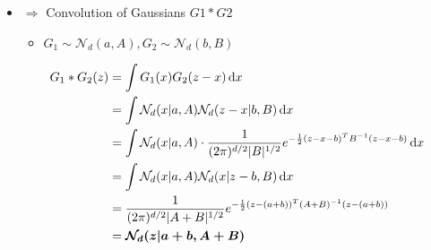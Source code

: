 \begin{itemize}
\begin{itemize}
	\item $\Rightarrow$ Convolution of Gaussians $G1* G2$
		\begin{itemize}
		\item $G_1\sim \mathcal N_d(a,A),G_2\sim \mathcal N_d(b,B)$
		\end{itemize}
		\begin{align*} \displaystyle G_1* G_2 (z) &= \int G_1(x)G_2(z-x)\mathop{}\!\mathrm{d} x \\ &= \int \mathcal N_d (x|a,A)\mathcal N_d(z-x|b,B)\mathop{}\!\mathrm{d} x \\ &= \int \mathcal N_d (x|a,A) \cdot \frac 1 {(2\pi)^{d/2} |B|^{1/2}} e^{-\frac 12 (z-x-b)^TB^{-1} (z-x-b)} \mathop{}\!\mathrm{d} x \\ &= \int \mathcal N_d (x|a,A)\mathcal N_d(x|z-b,B)\mathop{}\!\mathrm{d} x \\&= \frac 1 {(2\pi)^{d/2}|A+B|^{1/2}} e^{-\frac 12(z-(a+b))^T (A+B)^{-1} (z-(a+b))} \\&= \boldsymbol{\mathcal N_d(z|a+b,A+B)}  
		\end{align*}
	\end{itemize}
\end{itemize}

